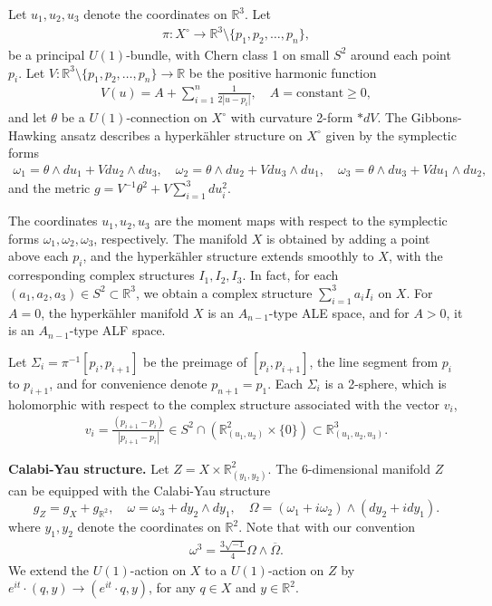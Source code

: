 \documentclass[11pt]{article}
\begin{document}
Let $u_1,u_2,u_3$ denote the coordinates on $\mathbb{R}^3$. Let 
\begin{align*}
\pi: X^{\circ} \to \mathbb{R}^3 \setminus \{p_1, p_2, \ldots, p_n\},    
\end{align*}
be a principal $U(1)$-bundle, with Chern class 1 on small $S^2$ around each point $p_i$. Let $V: \mathbb{R}^3 \setminus \{p_1, p_2, \ldots, p_n\} \to \mathbb{R}$ be the positive harmonic function 
\begin{align*}
    V(u) =  A + \sum_{i=1}^n \frac{1}{2 |u-p_i|},\quad A=\text{constant}\geq 0,
\end{align*}
and let $\theta$ be a $U(1)$-connection on $X^{\circ}$ with curvature 2-form $*dV$. The Gibbons-Hawking ansatz describes a hyperkähler structure on $X^{\circ}$ given by the symplectic forms
\begin{align*}
\omega_1 = \theta\wedge du_1  + V du_{2} \wedge du_{3}, \quad 
\omega_2 = \theta\wedge du_2   + V du_{3} \wedge du_{1}, \quad 
\omega_3 =\theta\wedge du_3   + V du_{1} \wedge du_{2},
\end{align*}
and the metric $g = V^{-1} \theta^2 + V \sum_{i=1}^3 du_i^2$. 

The coordinates $u_1,u_2, u_3$ are the moment maps with respect to the symplectic forms $\omega_1, \omega_2, \omega_3$, respectively. The manifold $X$ is obtained by adding a point above each $p_i$, and the hyperkähler structure extends smoothly to $X$, with the corresponding complex structures $I_1, I_2, I_3$.  In fact, for each $(a_1,a_2,a_3)\in S^2 \subset \mathbb{R}^3$, we obtain a complex structure $\sum_{i=1}^3 a_i I_i$ on $X$. For $A=0$, the hyperkähler manifold $X$ is an $A_{n-1}$-type ALE space, and for $A>0$, it is an $A_{n-1}$-type ALF space.

Let $\Sigma_i = \pi^{-1}[p_{i},p_{i+1}]$ be the preimage of $[p_{i},p_{i+1}]$, the line segment from $p_{i}$ to $p_{i+1}$, and for convenience denote $p_{n+1}=p_1$. Each $\Sigma_i$ is a 2-sphere, which is holomorphic with respect to the complex structure associated with the vector $v_i$, 
\begin{align*}
    v_{i} = \frac{(p_{i+1} - p_{i})}{|p_{i+1} - p_{i}|} \in S^2 \cap (\mathbb{R}_{(u_1,u_2)}^2 \times \{0\}) \subset \mathbb{R}_{(u_1,u_2,u_3)}^3.
\end{align*}

\vspace{5pt}

\noindent
\textbf{Calabi-Yau structure.} Let $Z = X \times \mathbb{R}^2_{(y_1,y_2)}$. The $6$-dimensional manifold $Z$ can be equipped with the Calabi-Yau structure 
\[
g_Z = g_X + g_{\mathbb{R}^2}, \quad \omega = \omega_3 + dy_2 \wedge dy_1,\quad \Omega = (\omega_1 + i \omega_2) \wedge (dy_2 + i dy_1).
\]
where $y_1, y_2$ denote the coordinates on $\mathbb{R}^2$. Note that with our convention
\begin{align*}
    \omega^3 = \frac{3\sqrt{-1}}{4} \Omega \wedge \overline{\Omega}.
\end{align*}
We extend the $U(1)$-action on $X$ to a $U(1)$-action on $Z$ by $e^{i t} \cdot (q,y) \to (e^{it} \cdot q, y)$, for any $q \in X$ and $y \in \mathbb{R}^2$.
\end{document}
